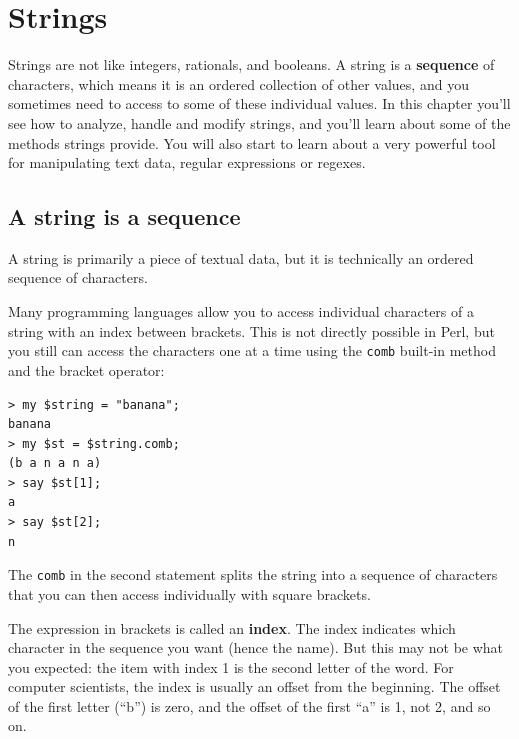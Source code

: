 
\chapter{Strings}
\label{strings}

Strings are not like integers, rationals, and booleans.  
A string is a {\bf sequence} of characters, which means 
it is an ordered collection of other values, and you 
sometimes need to access to some of these individual 
values.  In this chapter you'll see how to analyze, 
handle and modify strings, and you'll learn about some of the methods strings provide. You will also start to learn about 
a very powerful tool for manipulating text data, regular 
expressions or regexes.


\section{A string is a sequence}

A string is primarily a piece of textual data, but it 
is technically an ordered sequence of characters.  

Many programming languages allow you to access individual 
characters of a string with an index between brackets. This 
is not directly possible in Perl, but you still can access 
the characters one at a time using the {\tt comb} built-in 
method and the bracket operator:

\begin{verbatim}
> my $string = "banana";
banana
> my $st = $string.comb;
(b a n a n a)
> say $st[1];
a
> say $st[2];
n
\end{verbatim}
%
The {\tt comb} in the second statement splits the string 
into a sequence of characters that you can then access 
individually with square brackets.

The expression in brackets is called an {\bf index}.  
The index indicates which character in the sequence you
want (hence the name). But this may not be what you 
expected: the item with index 1 is the second letter of 
the word. For computer scientists, the index is usually 
an offset from the beginning. The offset of the first 
letter (``b'') is zero, and the 
offset of the first ``a'' is 1, not 2, and so on.

